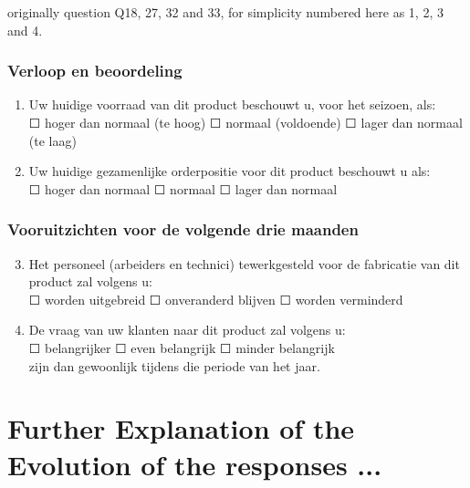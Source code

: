 \documentclass[12pt,a4paper,oneside]{book}
\begin{document}
originally question Q18, 27, 32 and 33, for simplicity numbered here as 1, 2, 3 and 4.

\subsubsection*{Verloop en beoordeling}
\begin{enumerate}
    \item Uw huidige voorraad van dit product beschouwt u, voor het seizoen, als: \\
	$\Square$	hoger dan normaal (te hoog)	$\Square$	normaal (voldoende)	$\Square$ lager dan normaal (te laag)
	
    \item Uw huidige gezamenlijke orderpositie voor dit product beschouwt u als: \\
	$\Square$ hoger dan normaal $\Square$ normaal $\Square$ lager dan normaal
\end{enumerate}

\subsubsection*{Vooruitzichten voor de volgende drie maanden} 
\begin{enumerate}
\setcounter{enumi}{2}
    \item Het personeel (arbeiders en technici) tewerkgesteld voor de fabricatie van dit product zal volgens u: \\
	$\Square$ worden uitgebreid $\Square$ onveranderd blijven $\Square$ worden verminderd
						
    \item De vraag van uw klanten naar dit product zal volgens u:  \\
	$\Square$ belangrijker $\Square$ even belangrijk $\Square$ minder belangrijk \\	
	zijn dan gewoonlijk tijdens die periode van het jaar.
\end{enumerate}

\newpage
\section*{Further Explanation of the Evolution of the responses ...}
\label{sec:appendix explanations EIR}
\end{document}
